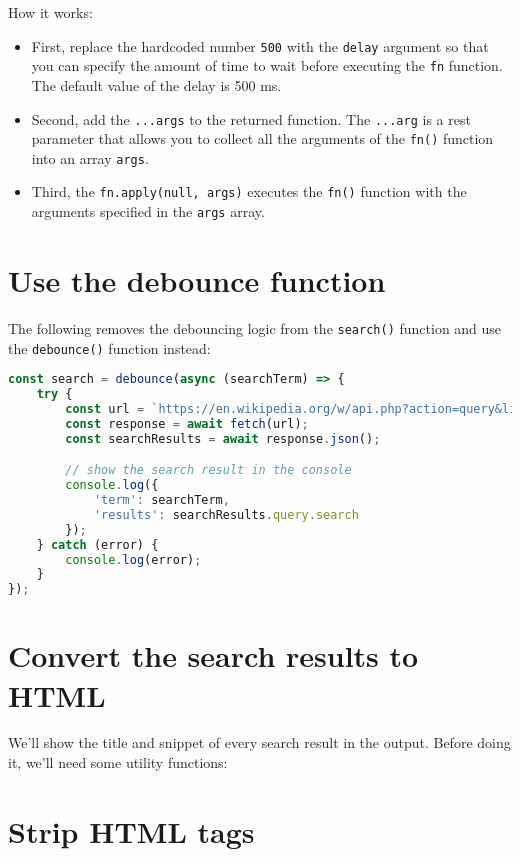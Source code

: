 \documentclass[11pt]{article}
\begin{document}
\noindent
How it works:

\begin{itemize}
\item First, replace the hardcoded number \verb|500| with the \verb|delay| argument so
that you can specify the amount of time to wait before executing the \verb|fn|
function. The default value of the delay is 500 ms.
\item Second, add the \verb|...args| to the returned function. The \verb|...arg|
is a rest parameter that allows you to collect all the arguments
of the \verb|fn()| function into an array \verb|args|.
\item Third, the \verb|fn.apply(null, args)| executes the \verb|fn()| function with
the arguments specified in the \verb|args| array.
\end{itemize}
\section*{Use the debounce function}

The following removes the debouncing logic from the \verb|search()| function
and use the \verb|debounce()| function instead:
\newpage
\begin{lstlisting}[language=JavaScript]
const search = debounce(async (searchTerm) => {
    try {
        const url = `https://en.wikipedia.org/w/api.php?action=query&list=search&prop=info|extracts&inprop=url&utf8=&format=json&origin=*&srlimit=10&srsearch=${searchTerm}`;
        const response = await fetch(url);
        const searchResults = await response.json();

        // show the search result in the console
        console.log({
            'term': searchTerm,
            'results': searchResults.query.search
        });
    } catch (error) {
        console.log(error);
    }
});
\end{lstlisting}

\section*{Convert the search results to HTML}

We'll show the title and snippet of every search result in the output.
Before doing it, we'll need some utility functions:

\section*{Strip HTML tags}
\end{document}
